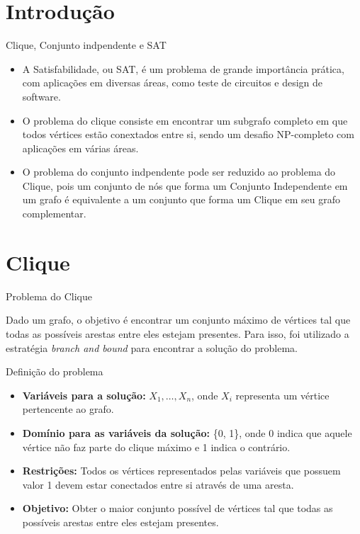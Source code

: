 \documentclass[compress,aspectratio=169]{beamer}
\subtitle[PAA]  {Clique, Conjunto Independente e SAT}
\begin{document}
\begindocument

\section{Introdução}
    \begin{frame}{Clique, Conjunto indpendente e SAT}
        \begin{justify}
            \begin{itemize}
                \item A Satisfabilidade, ou SAT, é um problema de grande importância prática, com aplicações em diversas áreas, como teste de circuitos e design de software.
                \item O problema do clique consiste em encontrar um subgrafo completo em que todos vértices estão conextados entre si, sendo um desafio NP-completo com aplicações em várias áreas.
                \item O problema do conjunto indpendente pode ser reduzido ao problema do Clique, pois um conjunto de nós que forma um Conjunto Independente em um grafo é equivalente a um conjunto que forma um Clique em seu grafo complementar.
            \end{itemize}
        \end{justify}
    \end{frame}


\section{Clique}
    \begin{frame}{Problema do Clique}
        \begin{justify}
            Dado um grafo, o objetivo é encontrar um conjunto máximo de vértices tal que todas as possíveis arestas entre eles estejam presentes. Para isso, foi utilizado a estratégia \textit{branch and bound} para encontrar a solução do problema.
        \end{justify}
    \end{frame}
    
    \begin{frame}{Definição do problema}
        \begin{itemize}
            \item \textbf{Variáveis para a solução:} \(X_1, \dots, X_n\), onde \(X_i\) representa um vértice pertencente ao grafo.
            \item \textbf{Domínio para as variáveis da solução:} \{0, 1\}, onde 0 indica que aquele vértice não faz parte do clique máximo e 1 indica o contrário.
            \item \textbf{Restrições:} Todos os vértices representados pelas variáveis que possuem valor 1 devem estar conectados entre si através de uma aresta.
            \item \textbf{Objetivo:} Obter o maior conjunto possível de vértices tal que todas as possíveis arestas entre eles estejam presentes.
        \end{itemize}
    \end{frame}
\end{document}
